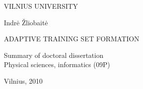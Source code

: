 \newpage

\thispagestyle{empty}                   %
\lithuanian

\begin{center}
	\vspace*{5mm}	
	
	VILNIUS UNIVERSITY \\

	
	
	\vspace{45mm}
	
	Indrė Žliobaitė
	
	\vspace{15mm}
	
  ADAPTIVE TRAINING SET FORMATION

  \vspace{30mm}
  
  Summary of doctoral dissertation\\[-6pt]  
  Physical sciences, informatics (09P)
  
  \vspace{60mm}
  
  Vilnius, 2010
  
\end{center}

\newpage
\thispagestyle{empty}                   %
\lithuanian

